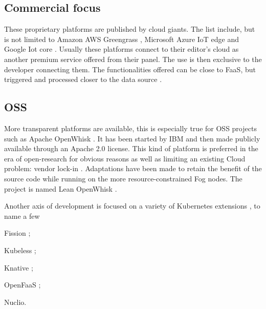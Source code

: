 \documentclass[11pt]{sdm}
\begin{document}
\subsection{Commercial focus}

These proprietary platforms are published by cloud giants. The list include, but is not limited to Amazon AWS Greengrass \cite{noauthor_aws_nodate}, Microsoft Azure IoT edge \cite{noauthor_iot_nodate} and Google Iot core \cite{noauthor_cloud_nodate}. Usually these platforms connect to their editor's cloud as another premium service offered from their panel. The use is then exclusive to the developer connecting them. The functionalities offered can be close to \gls{FaaS}, but triggered and processed closer to the data source \cite{elgamal_costless_2018}.

%    

\hypersetup{linkcolor=}
\subsection{\acrfull{OSS}}
More transparent platforms are available, this is especially true for \gls{OSS} projects such as Apache OpenWhisk \cite{noauthor_apache_nodate}. It has been started by IBM and then made publicly available through an Apache 2.0 license. This kind of platform is preferred in the era of open-research for obvious reasons as well as limiting an existing Cloud problem: vendor lock-in \cite{kjorveziroski_iot_2021}. Adaptations have been made to retain the benefit of the source code while running on the more resource-constrained Fog nodes. The project is named Lean OpenWhisk \cite{breitgand_lean_2018}.

Another axis of development is focused on a variety of Kubernetes extensions \cite{bocci_secure_2021}, to name a few
\begin{enumerate*}[(a)]
\item Fission ;
\item Kubeless ;
\item Knative ;
\item OpenFaaS ;
\item Nuclio.
\end{enumerate*}
\end{document}
